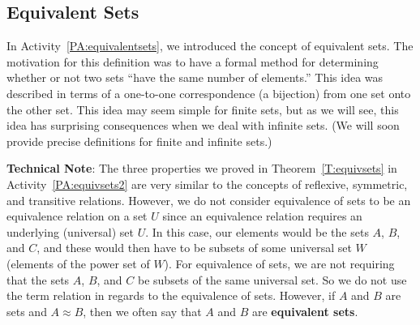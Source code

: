 \subsection*{Equivalent Sets}

In \typeu Activity~\ref*{PA:equivalentsets}, we introduced the concept of equivalent sets.  The motivation for this definition was to have a formal method for determining whether or not two sets ``have the same number of elements.''  This idea was described in terms of a one-to-one correspondence (a bijection) from one set onto the other set.  This idea may seem simple for finite sets, but as we will see, this idea has surprising consequences when we deal with infinite sets.  (We will soon provide precise definitions for finite and infinite sets.)

\newpar
\textbf{Technical Note}:   The three properties we proved in Theorem~\ref{T:equivsets} in \typeu Activity~\ref*{PA:equivsets2} are very similar to the concepts of reflexive, symmetric, and transitive relations.  However, we do not consider equivalence of sets to be an equivalence relation on a set $U$ since an equivalence relation requires an underlying (universal) set $U$.  In this case, our elements would be the sets $A$, $B$, and $C$, and these would then have to be subsets of some universal set $W$ (elements of the power set of $W$).  For equivalence of sets, we are not requiring that the sets $A$, $B$, and $C$ be subsets of the same universal set.  So we do not use the term relation in regards to the equivalence of sets.  However, if $A$ and $B$ are sets and 
$A \approx B$, then we often say that $A$ and $B$ are \textbf{equivalent sets}.

\hbreak

